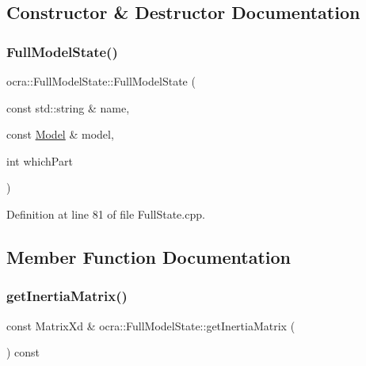 \subsection{Constructor \& Destructor Documentation}
\hypertarget{classocra_1_1FullModelState_a2fc326508bd940f338c614c18549a7ba}{}\label{classocra_1_1FullModelState_a2fc326508bd940f338c614c18549a7ba} 
\subsubsection{\texorpdfstring{Full\+Model\+State()}{FullModelState()}}
{\footnotesize\ttfamily ocra\+::\+Full\+Model\+State\+::\+Full\+Model\+State (\begin{DoxyParamCaption}\item[{const std\+::string \&}]{name,  }\item[{const \hyperlink{classocra_1_1Model}{Model} \&}]{model,  }\item[{int}]{which\+Part }\end{DoxyParamCaption})}



Definition at line 81 of file Full\+State.\+cpp.



\subsection{Member Function Documentation}
\hypertarget{classocra_1_1FullModelState_a988dec9567fd2b083ecfb6f3348d9a09}{}\label{classocra_1_1FullModelState_a988dec9567fd2b083ecfb6f3348d9a09} 
\subsubsection{\texorpdfstring{get\+Inertia\+Matrix()}{getInertiaMatrix()}}
{\footnotesize\ttfamily const Matrix\+Xd \& ocra\+::\+Full\+Model\+State\+::get\+Inertia\+Matrix (\begin{DoxyParamCaption}{ }\end{DoxyParamCaption}) const\hspace{0.3cm}{\ttfamily [virtual]}}



